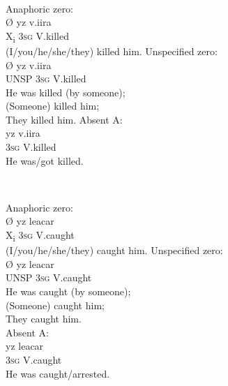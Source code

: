 \documentclass[output=collectionpaper]{langsci/langscibook}
\begin{document}
\ea
\label{ex:Nich:21}
\footnotemark{} \\
\begin{xlist}
\ex
Anaphoric zero:	\\
\gll Ø 	yz  	v.iira\\
X\textsubscript{i}	\textsc{3sg}	V.killed\\
\glt (I/you/he/she/they) killed him.
\ex
Unspecified zero:\\
\gll Ø	 yz	v.iira\\
UNSP	\textsc{3sg}	V.killed\\
\glt He was killed (by someone);\\
(Someone) killed him;\\
They killed him.
\ex
Absent A:	\\
\gll yz   	v.iira\\
\textsc{3sg}	V.killed\\
\glt He was/got killed.\\
\end{xlist}
\z
{}

\ea
\label{ex:Nich:22}
 \\
\begin{xlist}
\ex
Anaphoric zero:\\
\gll	Ø	yz  	leacar\\
X\textsubscript{i}	\textsc{3sg}	V.caught \\
\glt (I/you/he/she/they) caught him.
\ex
Unspecified zero: \\
\gll Ø	 yz	leacar\\
UNSP	\textsc{3sg}	V.caught\\
\glt	He was caught (by someone);\\
(Someone) caught him;\\
They caught him.\\
\ex
Absent A:\\
\gll yz   	leacar\\
\textsc{3sg}	V.caught \\
\glt He was caught/arrested.
\end{xlist}
\z
\end{document}
